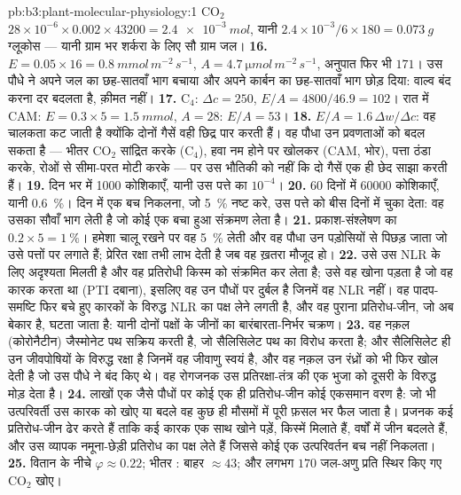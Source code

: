 \begin{solution}{pb:b3:plant-molecular-physiology:1}
CO$_{2}$ $28\times 10^{-6}\times 0.002\times\num{43200} =
\qty{2.4e-3}{mol}$, यानी $2.4\times 10^{-3}/6\times 180 =
\qty{0.073}{g}$ ग्लूकोस --- यानी ग्राम भर शर्करा के लिए सौ ग्राम जल।
\textbf{16.} $E = 0.05\times 16 = \qty{0.8}{mmol\,m^{-2}\,s^{-1}}$,
$A = \qty{4.7}{\micro mol\,m^{-2}\,s^{-1}}$, अनुपात फिर भी $171$। उस
पौधे ने अपने जल का छह-सातवाँ भाग बचाया और अपने कार्बन का छह-सातवाँ भाग
छोड़ दिया: वाल्व बंद करना दर बदलता है, क़ीमत नहीं।
\textbf{17.} C$_{4}$: $\Delta c = 250$, $E/A = 4800/46.9 = 102$। रात में
CAM: $E = 0.3\times 5 = \qty{1.5}{mmol}$, $A = 28$: $E/A = 53$।
\textbf{18.} $E/A = 1.6\,\Delta w/\Delta c$: वह चालकता कट जाती है
क्योंकि दोनों गैसें वही छिद्र पार करती हैं। वह पौधा उन प्रवणताओं को बदल
सकता है --- भीतर CO$_{2}$ सांद्रित करके (C$_{4}$), हवा नम होने पर
खोलकर (CAM, भोर), पत्ता ठंडा करके, रोओं से सीमा-परत मोटी करके ---
पर उस भौतिकी को नहीं कि दो गैसें एक ही छेद साझा करती हैं।
\textbf{19.} दिन भर में \num{1000} कोशिकाएँ, यानी उस पत्ते का $10^{-4}$।
\textbf{20.} 60 दिनों में \num{60000} कोशिकाएँ, यानी \qty{0.6}{\%}। दिन
में एक बच निकलना, जो \qty{5}{\%} नष्ट करे, उस पत्ते को बीस दिनों में
चुका देता: वह  उसका सौवाँ भाग लेती है जो कोई एक बचा
हुआ संक्रमण लेता है।
\textbf{21.} प्रकाश-संश्लेषण का $0.2\times 5 = \qty{1}{\%}$। हमेशा चालू
रखने पर वह \qty{5}{\%} लेती और वह पौधा उन पड़ोसियों से पिछड़ जाता जो
उसे पत्तों पर लगाते हैं; प्रेरित रक्षा तभी लाभ देती है जब वह ख़तरा
मौजूद हो।
\textbf{22.} उसे उस NLR के लिए अदृश्यता मिलती है और वह प्रतिरोधी किस्म
को संक्रमित कर लेता है; उसे वह खोना पड़ता है जो वह कारक करता था (PTI
दबाना), इसलिए वह उन पौधों पर दुर्बल है जिनमें वह NLR नहीं। वह
पादप-समष्टि फिर बचे हुए कारकों के विरुद्ध NLR का पक्ष लेने लगती है, और
वह पुराना प्रतिरोध-जीन, जो अब बेकार है, घटता जाता है: यानी दोनों पक्षों
के जीनों का बारंबारता-निर्भर चक्रण।
\textbf{23.} वह नक़ल (कोरोनैटीन) जैस्मोनेट पथ सक्रिय करती है, जो
सैलिसिलेट पथ का विरोध करता है; और सैलिसिलेट ही उन जीवपोषियों के विरुद्ध
रक्षा है जिनमें वह जीवाणु स्वयं है, और वह नक़ल उन रंध्रों को भी फिर खोल
देती है जो उस पौधे ने बंद किए थे। वह रोगजनक उस प्रतिरक्षा-तंत्र की एक
भुजा को दूसरी के विरुद्ध मोड़ देता है।
\textbf{24.} लाखों एक जैसे पौधों पर कोई एक ही प्रतिरोध-जीन कोई एकसमान
वरण है: जो भी उत्परिवर्ती उस कारक को खोए या बदले वह कुछ ही मौसमों में
पूरी फ़सल भर फैल जाता है। प्रजनक कई प्रतिरोध-जीन ढेर करते हैं ताकि कई
कारक एक साथ खोने पड़ें, किस्में मिलाते हैं, वर्षों में जीन बदलते हैं, और
उस व्यापक नमूना-छेड़ी प्रतिरोध का पक्ष लेते हैं जिससे कोई एक उत्परिवर्तन
बच नहीं निकलता।
\textbf{25.} वितान के नीचे $\varphi \approx 0.22$;  भीतर :
बाहर $\approx 43$; और लगभग $170$ जल-अणु प्रति स्थिर किए गए CO$_{2}$
खोए।
\end{solution}
